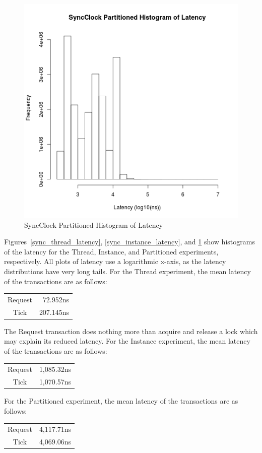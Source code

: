 \begin{figure}[H]
\center
\includegraphics[height=.4\textheight]{sync_partitioned_latency_hist.png}
\caption{SyncClock Partitioned Histogram of Latency}
\label{sync_partitioned_latency}
\end{figure}

Figures~\ref{sync_thread_latency}, \ref{sync_instance_latency}, and \ref{sync_partitioned_latency} show histograms of the latency for the Thread, Instance, and Partitioned experiments, respectively.
All plots of latency use a logarithmic x-axis, as the latency distributions have very long tails.
For the Thread experiment, the mean latency of the transactions are as follows:
\begin{center}
\begin{tabular}{cr}
Request &  72.952ns \\
Tick    & 207.145ns \\
\end{tabular}
\end{center}
The Request transaction does nothing more than acquire and release a lock which may explain its reduced latency.
For the Instance experiment, the mean latency of the transactions are as follows:
\begin{center}
\begin{tabular}{cr}
Request & 1,085.32ns \\
Tick    & 1,070.57ns \\
\end{tabular}
\end{center}
For the Partitioned experiment, the mean latency of the transactions are as follows:
\begin{center}
\begin{tabular}{cr}
Request & 4,117.71ns \\
Tick    & 4,069.06ns \\
\end{tabular}
\end{center}

